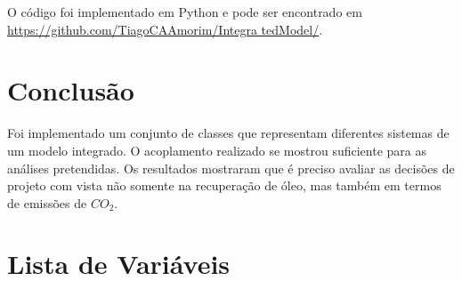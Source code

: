 \documentclass[final,5p]{elsarticle}
\numberwithin{equation}{section}
\begin{document}
        O código foi implementado em Python e pode ser encontrado em \href{https://github.com/TiagoCAAmorim/IntegratedModel/}{https://github.com/TiagoCAAmorim/Integra tedModel/}.

    \section{Conclusão}
        Foi implementado um conjunto de classes que representam diferentes sistemas de um modelo integrado. O acoplamento realizado se mostrou suficiente para as análises pretendidas.
        Os resultados mostraram que é preciso avaliar as decisões de projeto com vista não somente na recuperação de óleo, mas também em termos de emissões de $CO_2$.



\appendix

    \section{Lista de Variáveis}
\end{document}
